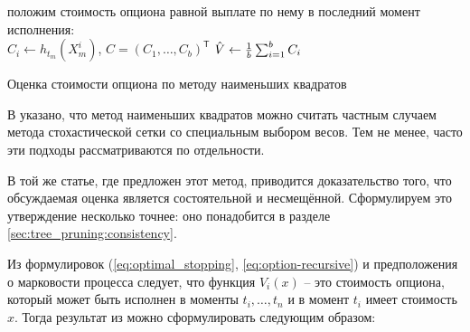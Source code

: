 \begin{algorithm}[h]
    
    положим стоимость опциона равной выплате по нему в последний момент исполнения:\\$C_i \leftarrow h_{t_m}\left(X_m^i\right)$, $C = \left(C_1, \dots, C_b\right)^{\mathsf T}$\;
    $\hat{V} \leftarrow \frac{1}{b}\sum_{i=1}^b C_i$

    \caption{Оценка стоимости опциона по методу наименьших квадратов}
\label{alg:least_squares_estimation}
\end{algorithm}

В \cite{Glasserman2004} указано, что метод наименьших квадратов можно считать частным случаем метода стохастической сетки со специальным выбором весов. Тем не менее, часто эти подходы рассматриваются по отдельности.

В той же статье, где предложен этот метод, приводится доказательство того, что обсуждаемая оценка является состоятельной и несмещённой. Сформулируем это утверждение несколько точнее: оно понадобится в разделе\,\ref{sec:tree_pruning:consistency}.

Из формулировок (\ref{eq:optimal_stopping}, \ref{eq:option-recursive}) и предположения о марковости процесса следует, что функция $V_i\left(x\right)$ -- это стоимость опциона, который может быть исполнен в моменты $t_i, \dots, t_n$ и в момент $t_i$ имеет стоимость $x$. Тогда результат из \cite{Longstaff2001} можно сформулировать следующим образом:

